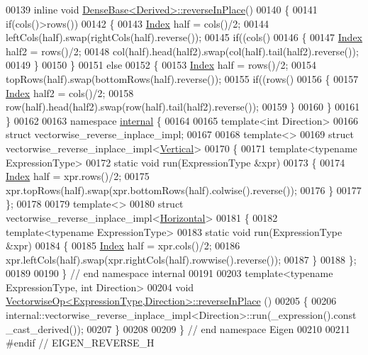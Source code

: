 \begin{DoxyCode}
00139 \textcolor{keyword}{inline} \textcolor{keywordtype}{void} \hyperlink{group___core___module_adb8045155ea45f7961fc2a5170e1d921}{DenseBase<Derived>::reverseInPlace}()
00140 \{
00141   \textcolor{keywordflow}{if}(cols()>rows())
00142   \{
00143     \hyperlink{namespace_eigen_a62e77e0933482dafde8fe197d9a2cfde}{Index} half = cols()/2;
00144     leftCols(half).swap(rightCols(half).reverse());
00145     \textcolor{keywordflow}{if}((cols()%
00146     \{
00147       \hyperlink{namespace_eigen_a62e77e0933482dafde8fe197d9a2cfde}{Index} half2 = rows()/2;
00148       col(half).head(half2).swap(col(half).tail(half2).reverse());
00149     \}
00150   \}
00151   \textcolor{keywordflow}{else}
00152   \{
00153     \hyperlink{namespace_eigen_a62e77e0933482dafde8fe197d9a2cfde}{Index} half = rows()/2;
00154     topRows(half).swap(bottomRows(half).reverse());
00155     \textcolor{keywordflow}{if}((rows()%
00156     \{
00157       \hyperlink{namespace_eigen_a62e77e0933482dafde8fe197d9a2cfde}{Index} half2 = cols()/2;
00158       row(half).head(half2).swap(row(half).tail(half2).reverse());
00159     \}
00160   \}
00161 \}
00162 
00163 \textcolor{keyword}{namespace }\hyperlink{namespaceinternal}{internal} \{
00164   
00165 \textcolor{keyword}{template}<\textcolor{keywordtype}{int} Direction>
00166 \textcolor{keyword}{struct }vectorwise\_reverse\_inplace\_impl;
00167 
00168 \textcolor{keyword}{template}<>
00169 \textcolor{keyword}{struct }vectorwise\_reverse\_inplace\_impl<\hyperlink{group__enums_ggad49a7b3738e273eb00932271b36127f7addca718e0564723df21d61b94b1198be}{Vertical}>
00170 \{
00171   \textcolor{keyword}{template}<\textcolor{keyword}{typename} ExpressionType>
00172   \textcolor{keyword}{static} \textcolor{keywordtype}{void} run(ExpressionType &xpr)
00173   \{
00174     \hyperlink{namespace_eigen_a62e77e0933482dafde8fe197d9a2cfde}{Index} half = xpr.rows()/2;
00175     xpr.topRows(half).swap(xpr.bottomRows(half).colwise().reverse());
00176   \}
00177 \};
00178 
00179 \textcolor{keyword}{template}<>
00180 \textcolor{keyword}{struct }vectorwise\_reverse\_inplace\_impl<\hyperlink{group__enums_ggad49a7b3738e273eb00932271b36127f7aae8a16b3b9272683c1162915f6d892be}{Horizontal}>
00181 \{
00182   \textcolor{keyword}{template}<\textcolor{keyword}{typename} ExpressionType>
00183   \textcolor{keyword}{static} \textcolor{keywordtype}{void} run(ExpressionType &xpr)
00184   \{
00185     \hyperlink{namespace_eigen_a62e77e0933482dafde8fe197d9a2cfde}{Index} half = xpr.cols()/2;
00186     xpr.leftCols(half).swap(xpr.rightCols(half).rowwise().reverse());
00187   \}
00188 \};
00189 
00190 \} \textcolor{comment}{// end namespace internal}
00191 
00203 \textcolor{keyword}{template}<\textcolor{keyword}{typename} ExpressionType, \textcolor{keywordtype}{int} Direction>
00204 \textcolor{keywordtype}{void} \hyperlink{group___core___module_ab9dd7c273eb2ba8defaab2d55156936b}{VectorwiseOp<ExpressionType,Direction>::reverseInPlace}
      ()
00205 \{
00206   internal::vectorwise\_reverse\_inplace\_impl<Direction>::run(\_expression().const\_cast\_derived());
00207 \}
00208 
00209 \} \textcolor{comment}{// end namespace Eigen}
00210 
00211 \textcolor{preprocessor}{#endif // EIGEN\_REVERSE\_H}
\end{DoxyCode}
